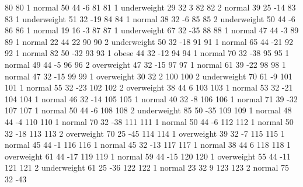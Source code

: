 \begin{Schunk}
\begin{Soutput}
80           80   1      normal  50         44           -6
81           81   1 underweight  29         32            3
82           82   2      normal  39         25          -14
83           83   1 underweight  51         32          -19
84           84   1      normal  38         32           -6
85           85   2 underweight  50         44           -6
86           86   1      normal  19         16           -3
87           87   1 underweight  67         32          -35
88           88   1      normal  47         44           -3
89           89   1      normal  22         44           22
90           90   2 underweight  50         32          -18
91           91   1      normal  65         44          -21
92           92   1      normal  82         50          -32
93           93   1       obese  44         32          -12
94           94   1      normal  70         32          -38
95           95   1      normal  49         44           -5
96           96   2  overweight  47         32          -15
97           97   1      normal  61         39          -22
98           98   1      normal  47         32          -15
99           99   1  overweight  30         32            2
100         100   2 underweight  70         61           -9
101         101   1      normal  55         32          -23
102         102   2  overweight  38         44            6
103         103   1      normal  53         32          -21
104         104   1      normal  46         32          -14
105         105   1      normal  40         32           -8
106         106   1      normal  71         39          -32
107         107   1      normal  50         44           -6
108         108   2 underweight  85         50          -35
109         109   1      normal  48         44           -4
110         110   1      normal  70         32          -38
111         111   1      normal  50         44           -6
112         112   1      normal  50         32          -18
113         113   2  overweight  70         25          -45
114         114   1  overweight  39         32           -7
115         115   1      normal  45         44           -1
116         116   1      normal  45         32          -13
117         117   1      normal  38         44            6
118         118   1  overweight  61         44          -17
119         119   1      normal  59         44          -15
120         120   1  overweight  55         44          -11
121         121   2 underweight  61         25          -36
122         122   1      normal  23         32            9
123         123   2      normal  75         32          -43

\end{Soutput}
\end{Schunk}
